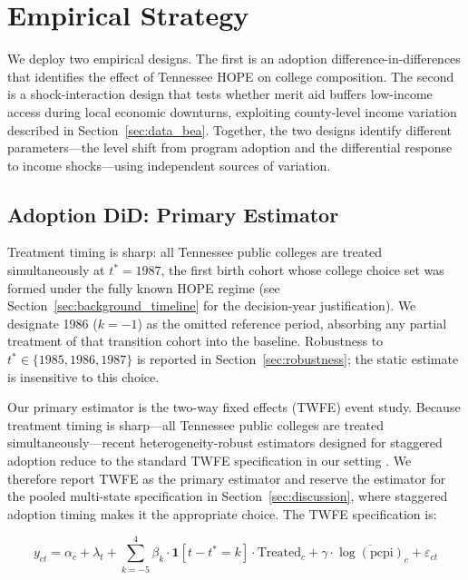 
\section{Empirical Strategy}
\label{sec:empirical_strategy}

We deploy two empirical designs. The first is an adoption
difference-in-differences that identifies the effect of Tennessee HOPE
on college composition. The second is a shock-interaction design that
tests whether merit aid buffers low-income access during local economic
downturns, exploiting county-level income variation described in
Section~\ref{sec:data_bea}. Together, the two designs identify
different parameters---the level shift from program adoption and the
differential response to income shocks---using independent sources of
variation.

\subsection{Adoption DiD: Primary Estimator}

Treatment timing is sharp: all Tennessee public colleges are treated
simultaneously at $t^* = 1987$, the first birth cohort whose college
choice set was formed under the fully known HOPE regime (see
Section~\ref{sec:background_timeline} for the decision-year
justification). We designate 1986 ($k = -1$) as the omitted reference
period, absorbing any partial treatment of that transition cohort into
the baseline. Robustness to $t^* \in \{1985, 1986, 1987\}$ is
reported in Section~\ref{sec:robustness}; the static estimate is
insensitive to this choice.

Our primary estimator is the two-way fixed effects (TWFE) event study.
Because treatment timing is sharp---all Tennessee public colleges are
treated simultaneously---recent heterogeneity-robust estimators
designed for staggered adoption
\parencite{callaway2021difference, sun2021estimating} reduce to the
standard TWFE specification in our setting
\parencite{roth2026interpreting}. We therefore report TWFE as
the primary estimator and reserve the
\textcite{callaway2021difference} estimator for the pooled multi-state
specification in Section~\ref{sec:discussion}, where staggered
adoption timing makes it the appropriate choice. The TWFE
specification is:

\begin{equation}
y_{ct} = \alpha_c + \lambda_t + \sum_{k=-5}^{4} \beta_k \cdot
\mathbf{1}[t - t^* = k] \cdot \text{Treated}_c + \gamma \cdot
\overline{\log(\text{pcpi})}_{c} + \varepsilon_{ct}
\label{eq:twfe}
\end{equation}

